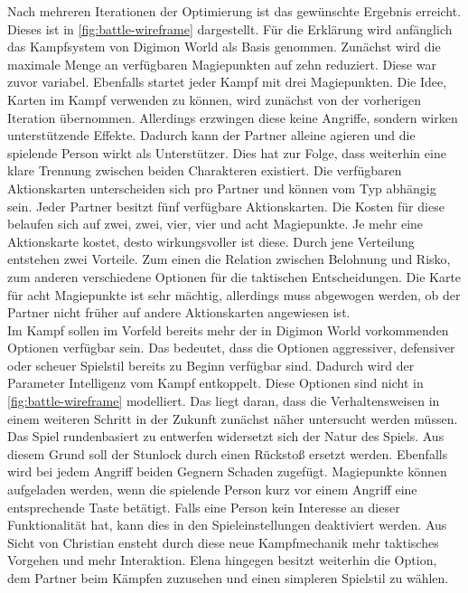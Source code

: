 Nach mehreren Iterationen der Optimierung ist das gewünschte Ergebnis erreicht. Dieses ist in \autoref{fig:battle-wireframe} dargestellt. Für die Erklärung wird anfänglich das Kampfsystem von Digimon World als Basis genommen. Zunächst wird die maximale Menge an verfügbaren Magiepunkten auf zehn reduziert. Diese war zuvor variabel. Ebenfalls startet jeder Kampf mit drei Magiepunkten. Die Idee, Karten im Kampf verwenden zu können, wird zunächst von der vorherigen Iteration übernommen. Allerdings erzwingen diese keine Angriffe, sondern wirken unterstützende Effekte. Dadurch kann der Partner alleine agieren und die spielende Person wirkt als Unterstützer. Dies hat zur Folge, dass weiterhin eine klare Trennung zwischen beiden Charakteren existiert. Die verfügbaren Aktionskarten unterscheiden sich pro Partner und können vom Typ abhängig sein. Jeder Partner besitzt fünf verfügbare Aktionskarten. Die Kosten für diese belaufen sich auf zwei, zwei, vier, vier und acht Magiepunkte. Je mehr eine Aktionskarte kostet, desto wirkungsvoller ist diese. Durch jene Verteilung entstehen zwei Vorteile. Zum einen die Relation zwischen Belohnung und Risko, zum anderen verschiedene Optionen für die taktischen Entscheidungen. Die Karte für acht Magiepunkte ist sehr mächtig, allerdings muss abgewogen werden, ob der Partner nicht früher auf andere Aktionskarten angewiesen ist.\\

Im Kampf sollen im Vorfeld bereits mehr der in Digimon World vorkommenden Optionen verfügbar sein. Das bedeutet, dass die Optionen aggressiver, defensiver oder scheuer Spielstil bereits zu Beginn verfügbar sind. Dadurch wird der Parameter Intelligenz vom Kampf entkoppelt. Diese Optionen sind nicht in \autoref{fig:battle-wireframe} modelliert. Das liegt daran, dass die Verhaltensweisen in einem weiteren Schritt in der Zukunft zunächst näher untersucht werden müssen. Das Spiel rundenbasiert zu entwerfen widersetzt sich der Natur des Spiels. Aus diesem Grund soll der Stunlock durch einen Rückstoß ersetzt werden. Ebenfalls wird bei jedem Angriff beiden Gegnern Schaden zugefügt. Magiepunkte können aufgeladen werden, wenn die spielende Person kurz vor einem Angriff eine entsprechende Taste betätigt. Falls eine Person kein Interesse an dieser Funktionalität hat, kann dies in den Spieleinstellungen deaktiviert werden. Aus Sicht von Christian ensteht durch diese neue Kampfmechanik mehr taktisches Vorgehen und mehr Interaktion. Elena hingegen besitzt weiterhin die Option, dem Partner beim Kämpfen zuzusehen und einen simpleren Spielstil zu wählen.\\

